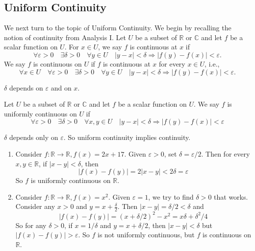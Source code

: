 \documentclass[a4paper,11pt]{article}
\begin{document}
\subsection{Uniform Continuity}
We next turn to the topic of Uniform Continuity. We begin by recalling the notion of continuity from Analysis I.
Let $U$ be a subset of $\mathbb{R}$ or $\mathbb{C}$ and let $f$ be a scalar function on $U$. For $x \in U$, we say $f$ is continuous at $x$ if
\[
\forall \varepsilon>0 \quad \exists \delta>0 \quad \forall y \in U \quad|y-x|<\delta \Longrightarrow|f(y)-f(x)|<\varepsilon.
\]
We say $f$ is continuous on $U$ if $f$ is continuous at $x$ for every $x \in U$, i.e.,
\[
    \forall x \in U \quad \forall \varepsilon>0 \quad \exists \delta>0 \quad \forall y \in U \quad|y-x|<\delta \Longrightarrow|f(y)-f(x)|<\varepsilon.
\]
\begin{note}
    $\delta$ depends on $\varepsilon$ and on $x$.
\end{note}

\begin{definition}
    Let $U$ be a subset of $\mathbb{R}$ or $\mathbb{C}$ and let $f$ be a scalar function on $U$. We say $f$ is uniformly continuous on $U$ if
\[
\forall \varepsilon>0 \quad \exists \delta>0 \quad \forall x, y \in U \quad|y-x|<\delta \Longrightarrow|f(y)-f(x)|<\varepsilon
\]
\end{definition}

\begin{note}
    $\delta$ depends only on $\varepsilon$. So uniform continuity implies continuity.
\end{note}

\begin{example}
    \begin{enumerate}
        \item Consider $f: \mathbb{R} \rightarrow \mathbb{R}, f(x)=2x+17$. Given $\varepsilon>0$, set $\delta=\varepsilon / 2$. Then for every $x, y \in \mathbb{R}$, if $|x-y|<\delta$, then
        \[
        |f(x)-f(y)|=2|x-y|<2 \delta=\varepsilon
        \]
        So $f$ is uniformly continuous on $\mathbb{R}$.
        \item Consider $f: \mathbb{R} \rightarrow \mathbb{R}, f(x)=x^{2}$. Given $\varepsilon=1$, we try to find $\delta>0$ that works. Consider any $x>0$ and $y=x+\frac{\delta}{2}$. Then $|x-y|=\delta / 2<\delta$ and
        \[
        |f(x)-f(y)|=(x+\delta / 2)^{2}-x^{2}=x \delta+\delta^{2} / 4
        \]
        So for any $\delta>0$, if $x=1 / \delta$ and $y=x+\delta / 2$, then $|x-y|<\delta$ but $|f(x)-f(y)|>\varepsilon$. So $f$ is not uniformly continuous, but $f$ is continuous on $\mathbb{R}$.
    \end{enumerate}
\end{example}
\end{document}
